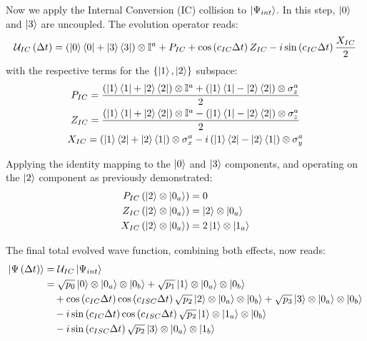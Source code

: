 \documentclass[a4paper,12pt]{article}
\begin{document}
Now we apply the Internal Conversion (IC) collision to $ \ket{\Psi_{int}} $. In this step, $ \ket{0} $ and $ \ket{3} $ are uncoupled. The evolution operator reads:
\begin{equation}
	\mathcal{U}_{IC} \left( \Delta t \right) = \left( \ket{0}\bra{0} + \ket{3}\bra{3} \right) \otimes \mathbb{I}^{a} + P_{IC} + \cos \left( c_{IC} \Delta t \right) Z_{IC} - i \sin \left( c_{IC} \Delta t \right) \frac{X_{IC}}{2} 
\end{equation} 
with the respective terms for the $ \{ \ket{1}, \ket{2} \} $ subspace:
\begin{gather}
	P_{IC} = \frac{\left( \ket{1}\bra{1} + \ket{2}\bra{2} \right) \otimes \mathbb{I}^{a} + \left( \ket{1}\bra{1} - \ket{2}\bra{2} \right) \otimes \sigma_{z}^{a} }{2} \\
	Z_{IC} = \frac{\left( \ket{1}\bra{1} + \ket{2}\bra{2} \right) \otimes \mathbb{I}^{a} - \left( \ket{1}\bra{1} - \ket{2}\bra{2} \right) \otimes \sigma_{z}^{a} }{2} \\
	X_{IC} = \left( \ket{1}\bra{2} + \ket{2}\bra{1} \right) \otimes \sigma_{x}^{a} - i \left( \ket{1}\bra{2} - \ket{2}\bra{1} \right) \otimes \sigma_{y}^{a}
\end{gather}

Applying the identity mapping to the $ \ket{0} $ and $ \ket{3} $ components, and operating on the $ \ket{2} $ component as previously demonstrated:
\begin{align}
	P_{IC} \left( \ket{2} \otimes \ket{0_{a}} \right) &= 0 \\
	Z_{IC} \left( \ket{2} \otimes \ket{0_{a}} \right) &= \ket{2} \otimes \ket{0_{a}} \\
	X_{IC} \left( \ket{2} \otimes \ket{0_{a}} \right) &= 2 \ket{1} \otimes \ket{1_{a}}
\end{align}

The final total evolved wave function, combining both effects, now reads: 
\begin{align}
	\ket{\Psi \left( \Delta t \right)} &= \mathcal{U}_{IC} \ket{\Psi_{int}} \notag \\
	&= \sqrt{p_{0}} \ket{0} \otimes \ket{0_{a}} \otimes \ket{0_{b}} + \sqrt{p_{1}} \ket{1} \otimes \ket{0_{a}} \otimes \ket{0_{b}} \notag \\
	&\quad + \cos \left( c_{IC} \Delta t \right) \cos \left( c_{ISC} \Delta t \right) \sqrt{p_{2}} \ket{2} \otimes \ket{0_{a}} \otimes \ket{0_{b}} + \sqrt{p_{3}} \ket{3} \otimes \ket{0_{a}} \otimes \ket{0_{b}} \notag \\
	&\quad - i \sin \left( c_{IC} \Delta t \right) \cos \left( c_{ISC} \Delta t \right) \sqrt{p_{2}} \ket{1} \otimes \ket{1_{a}} \otimes \ket{0_{b}} \notag \\
	&\quad - i \sin \left( c_{ISC} \Delta t \right) \sqrt{p_{2}} \ket{3} \otimes \ket{0_{a}} \otimes \ket{1_{b}}
\end{align}
\end{document}
